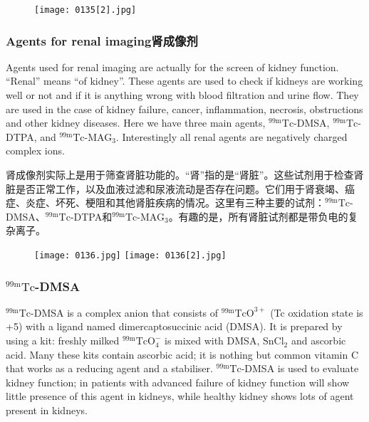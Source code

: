 \documentclass[dvipsnames, svgnames,a4paper,11pt]{article}
\begin{document}
 \begin{figure}[h]
	\centering
    \texttt{[image: 0135[2].jpg]}    
     \label{fig138}
\end{figure}

\subsubsection{Agents for renal imaging肾成像剂}

Agents used for renal imaging are actually for the screen of kidney function. “Renal”
means “of kidney”. These agents are used to check if kidneys are working well or not
and if it is anything wrong with blood filtration and urine flow. They are used in the
case of kidney failure, cancer, inflammation, necrosis, obstructions and other kidney
diseases. Here we have three main agents, ${}^\mathrm{99m}\mathrm{Tc}$-DMSA, ${}^\mathrm{99m}\mathrm{Tc}$-DTPA, and ${}^\mathrm{99m}\mathrm{Tc}$-MAG${}_3$. Interestingly all renal agents are negatively charged complex ions.

肾成像剂实际上是用于筛查肾脏功能的。“肾”指的是“肾脏”。这些试剂用于检查肾脏是否正常工作，以及血液过滤和尿液流动是否存在问题。它们用于肾衰竭、癌症、炎症、坏死、梗阻和其他肾脏疾病的情况。这里有三种主要的试剂：${}^\mathrm{99m}\mathrm{Tc}$-DMSA、${}^\mathrm{99m}\mathrm{Tc}$-DTPA和${}^\mathrm{99m}\mathrm{Tc}$-MAG${}_3$。有趣的是，所有肾脏试剂都是带负电的复杂离子。

\begin{figure}[h]
	\centering
    \texttt{[image: 0136.jpg]}    
    \hspace{0.1in}
    \texttt{[image: 0136[2].jpg]} 
     \label{fig139}
\end{figure}

\subsubsection{${}^\mathrm{99m}\mathrm{Tc}$-DMSA}

${}^\mathrm{99m}\mathrm{Tc}$-DMSA is a complex anion that consists of ${}^\mathrm{99m}\mathrm{TcO^{3+}}$ (Tc oxidation state is +5)
with a ligand named dimercaptosuccinic acid (DMSA). It is prepared by using a kit:
freshly milked ${}^\mathrm{99m}\mathrm{TcO_4^-}$ is mixed with DMSA, $\mathrm{SnCl_2}$ and ascorbic acid. Many these
kits contain ascorbic acid; it is nothing but common vitamin C that works as a
reducing agent and a stabiliser. ${}^\mathrm{99m}\mathrm{Tc}$-DMSA is used to evaluate kidney function; in
patients with advanced failure of kidney function will show little presence of this
agent in kidneys, while healthy kidney shows lots of agent present in kidneys.
\end{document}
